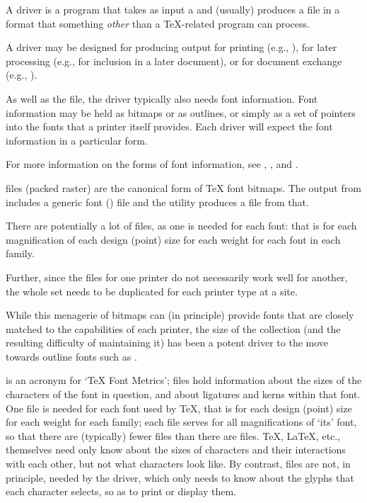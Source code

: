 
A  driver is a program that takes as input a
and (usually) produces a file in a format that something \emph{other}
than a \TeX{}-related program can process.

A driver may be designed for producing output for printing (e.g.,
\PS{}), for later processing (e.g., \PS{} for inclusion in a later
document), or for document exchange (e.g., ).

As well as the  file, the driver typically also needs font
information.  Font information may be held as bitmaps or as outlines,
or simply as a set of pointers into the fonts that a printer itself
provides.  Each driver will expect the font information in a particular
form.

For more information on the forms of font information, see
,
,
and .


 files (packed raster) are the canonical form of \TeX{} font
bitmaps.  The output from  includes a generic
font () file and the utility  produces a
 file from that.

There are potentially a lot of  files, as one
is needed for each font: that is for each magnification of each
design (point) size for each weight for each font in each family.

Further, since the  files for one printer do not necessarily
work well for another, the whole set needs to be duplicated for each
printer type at a site.

While this menagerie of bitmaps can (in principle) provide fonts that
are closely matched to the capabilities of each printer, the size of
the collection (and the resulting difficulty of maintaining it) has
been a potent driver to the move towards outline fonts such as
.


 is an acronym for `\TeX{} Font Metrics';  files hold
information about the sizes of the characters of the font in question,
and about ligatures and kerns within that font.  One  file is
needed for each font used by \TeX{}, that is for each design (point)
size for each weight for each family; each  file serves for all
magnifications of `its' font, so that there are (typically) fewer
 files than there are  files.  \TeX{},
\LaTeX{}, etc.,\@
themselves need only know about the sizes of characters and their
interactions with each other, but not what characters look like.  By
contrast,  files are not, in principle, needed by the
 driver, which only needs to know about the glyphs that each
character selects, so as to print or display them.

